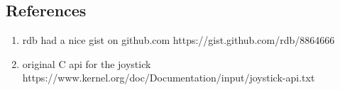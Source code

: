\documentclass[titlepage]{article}
\begin{document}
\subsection{References}
\begin{enumerate}[(1)]
\item rdb had a nice gist on github.com https://gist.github.com/rdb/8864666
\item original C api for the joystick https://www.kernel.org/doc/Documentation/input/joystick-api.txt

\end{enumerate}
\end{document}
